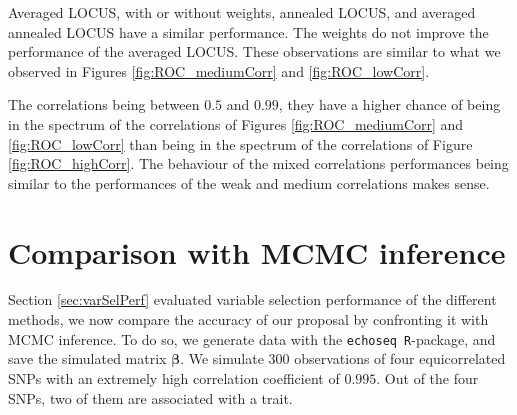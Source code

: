 \documentclass[a4paper, 11pt]{report}
\numberwithin{equation}{chapter}
\begin{document}
Averaged LOCUS, with or without weights, annealed LOCUS, and averaged annealed LOCUS have a similar performance. The weights do not improve the performance of the averaged LOCUS. These observations are similar to what we observed in Figures \ref{fig:ROC_mediumCorr} and  \ref{fig:ROC_lowCorr}. 

The correlations being between $0.5$ and $0.99$, they have a higher chance of being in the spectrum of the correlations of Figures \ref{fig:ROC_mediumCorr} and \ref{fig:ROC_lowCorr} than being in the spectrum of the correlations of Figure \ref{fig:ROC_highCorr}. The behaviour of the mixed correlations performances being similar to the performances of the weak and medium correlations makes sense. 


\section{Comparison with MCMC inference}
Section \ref{sec:varSelPerf} evaluated variable selection performance of the different methods, we now compare the accuracy of our proposal by confronting it with MCMC inference. To do so, we generate data with the \texttt{echoseq R}-package, and save the simulated matrix $\boldsymbol{\beta}$. We simulate $300$ observations of four equicorrelated SNPs with an extremely high correlation coefficient of $0.995$. Out of the four SNPs, two of them are associated with a trait.
\end{document}
